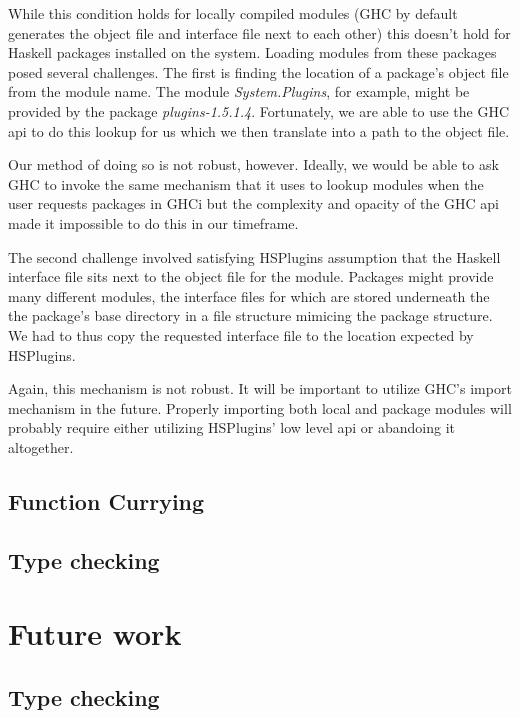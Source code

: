 \documentclass[11pt, letterpaper, oneside, twocolumn] {article}
\begin{document}
While this condition holds for locally compiled modules (GHC by default generates the object file and interface file next to each other) this doesn't hold for Haskell packages installed on the system. Loading modules from these packages posed several challenges. The first is finding the location of a package's object file from the module name. The module \emph{System.Plugins}, for example, might be provided by the package \emph{plugins-1.5.1.4}. Fortunately, we are able to use the GHC api to do this lookup for us which we then translate into a path to the object file.

Our method of doing so is not robust, however. Ideally, we would be able to ask GHC to invoke the same mechanism that it uses to lookup modules when the user requests packages in GHCi but the complexity and opacity of the GHC api made it impossible to do this in our timeframe.

The second challenge involved satisfying HSPlugins assumption that the Haskell interface file sits next to the object file for the module. Packages might provide many different modules, the interface files for which are stored underneath the the package's base directory in a file structure mimicing the package structure. We had to thus copy the requested interface file to the location expected by HSPlugins.

Again, this mechanism is not robust. It will be important to utilize GHC's import mechanism in the future. Properly importing both local and package modules will probably require either utilizing HSPlugins' low level api or abandoing it altogether.

\subsection{Function Currying}


\subsection{Type checking}


\section{Future work}

\subsection{Type checking}
\end{document}
